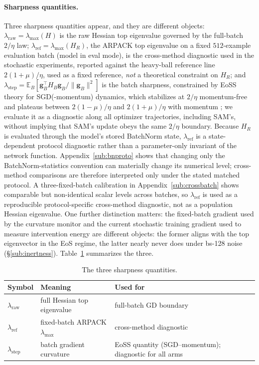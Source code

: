 \documentclass{article}
\theoremstyle{plain}
\theoremstyle{definition}
\theoremstyle{remark}
\newcommand{\lmax}{\lambda_{\max}}
\newcommand{\lraw}{\ensuremath{\lambda_{\mathrm{raw}}}}
\newcommand{\lref}{\ensuremath{\lambda_{\mathrm{ref}}}}
\newcommand{\lstep}{\ensuremath{\lambda_{\mathrm{step}}}}
\begin{document}
\paragraph{Sharpness quantities.}
Three sharpness quantities appear, and they are different objects:
$\lraw=\lmax(H)$ is the raw Hessian top eigenvalue
governed by the full-batch $2/\eta$ law; $\lref=
\lmax(H_R)$, the ARPACK top eigenvalue on a fixed $512$-example
evaluation batch (model in eval mode), is the cross-method
diagnostic used in the stochastic experiments, reported against the
heavy-ball reference line $2(1{+}\mu)/\eta$, used as a fixed
reference, \emph{not} a
theoretical constraint on $H_R$; and
$\lstep=\mathbb{E}_{B}[\mathbf{g}_{B}^{\!\top}H_{B}
\mathbf{g}_{B}/\|\mathbf{g}_{B}\|^{2}]$ is the batch sharpness, constrained
by EoSS theory for SGD(-momentum) dynamics, which stabilizes at $2/\eta$
momentum-free and
plateaus between $2(1{-}\mu)/\eta$ and $2(1{+}\mu)/\eta$ with
momentum \citep{andreyev2024eoss,andreyev2026momentum}; we evaluate it
as a diagnostic along all optimizer trajectories, including SAM's,
without implying that SAM's update obeys the same $2/\eta$
boundary. Because $H_R$ is evaluated through the model's stored
BatchNorm state, $\lref$ is a state-dependent protocol diagnostic
rather than a parameter-only invariant of the network function.
Appendix~\ref{sub:bnproto} shows that changing only the
BatchNorm-statistics convention can materially change its numerical
level; cross-method comparisons are therefore interpreted only under
the stated matched protocol. A three-fixed-batch calibration in
Appendix~\ref{sub:crossbatch} shows comparable but non-identical
scalar levels across batches, so $\lref$ is used as a reproducible
protocol-specific cross-method diagnostic, not as a population Hessian
eigenvalue. One further
distinction matters: the fixed-batch gradient used by the curvature
monitor and the current stochastic training gradient used to measure
intervention energy are different objects: the former aligns with the
top eigenvector in the EoS regime, the latter nearly never does under
bs-128 noise (\S\ref{sub:inertness}). Table~\ref{tab:quantities}
summarizes the three.

\begin{table}[t]
\centering
\small
\begin{tabular}{@{}lll@{}}
\toprule
Symbol & Meaning & Used for \\
\midrule
$\lraw$ & full Hessian top eigenvalue & full-batch GD boundary \\
$\lref$ & fixed-batch ARPACK $\lmax$ & cross-method diagnostic \\
$\lstep$ & batch gradient curvature & EoSS quantity (SGD--momentum); diagnostic for all arms \\
\bottomrule
\end{tabular}
\caption{The three sharpness quantities.}
\label{tab:quantities}
\end{table}
\end{document}
